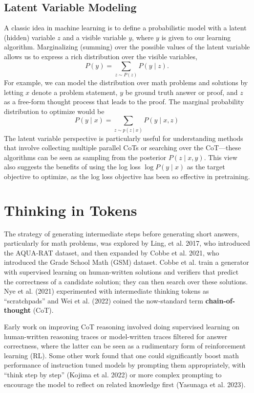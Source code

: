 \documentclass[12pt]{article}
\begin{document}
\subsection{Latent Variable Modeling}

A classic idea in machine learning is to define a probabilistic model with a latent (hidden) variable $z$ and a visible variable $y$, where $y$ is given to our learning algorithm. Marginalizing (summing) over the possible values of the latent variable allows us to express a rich distribution over the visible variables,
\[
P(y) = \sum_{z \sim P(z)} P(y \mid z).
\]
For example, we can model the distribution over math problems and solutions by letting $x$ denote a problem statement, $y$ be ground truth answer or proof, and $z$ as a free-form thought process that leads to the proof. The marginal probability distribution to optimize would be
\[
P(y \mid x) = \sum_{z \sim p(z\mid x)} P(y \mid x, z)
\]
The latent variable perspective is particularly useful for understanding methods that involve collecting multiple parallel CoTs or searching over the CoT---these algorithms can be seen as sampling from the posterior $P(z \mid x, y)$. This view also suggests the benefits of using the log loss $\log P(y \mid x)$ as the target objective to optimize, as the log loss objective has been so effective in pretraining.

\section{Thinking in Tokens}

The strategy of generating intermediate steps before generating short answers, particularly for math problems, was explored by Ling, et al. 2017, who introduced the AQUA-RAT dataset, and then expanded by Cobbe et al. 2021, who introduced the Grade School Math (GSM) dataset. Cobbe et al. train a generator with supervised learning on human-written solutions and verifiers that predict the correctness of a candidate solution; they can then search over these solutions. Nye et al. (2021) experimented with intermediate thinking tokens as ``scratchpads'' and Wei et al. (2022) coined the now-standard term \textbf{chain-of-thought} (CoT).

Early work on improving CoT reasoning involved doing supervised learning on human-written reasoning traces or model-written traces filtered for answer correctness, where the latter can be seen as a rudimentary form of reinforcement learning (RL). Some other work found that one could significantly boost math performance of instruction tuned models by prompting them appropriately, with ``think step by step'' (Kojima et al. 2022) or more complex prompting to encourage the model to reflect on related knowledge first (Yasunaga et al. 2023).
\end{document}
